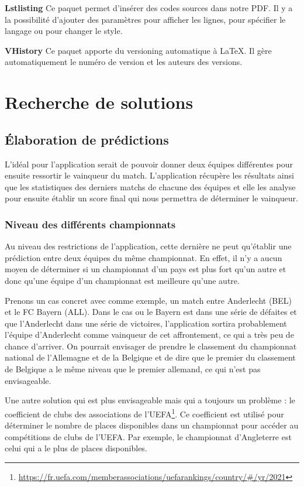\documentclass[a4paper,14pt]{extarticle}
\begin{document}
{\noindent\textbf{Lstlisting}
Ce paquet permet d'insérer des codes sources dans notre PDF. Il y a la possibilité d'ajouter des paramètres pour afficher les lignes, pour spécifier le langage ou pour changer le style.

\noindent\textbf{VHistory}
Ce paquet apporte du versioning automatique à \LaTeX. Il gère automatiquement le numéro de version et les auteurs des versions.

\section{Recherche de solutions}

\subsection{Élaboration de prédictions}

L'idéal pour l'application serait de pouvoir donner deux équipes différentes pour ensuite ressortir le vainqueur du match. L'application récupère les résultats ainsi que les statistiques des derniers matchs de chacune des équipes et elle les analyse pour ensuite établir un score final qui nous permettra de déterminer le vainqueur.


\subsubsection{Niveau des différents championnats}
\label{niveauDifferentChampionnats}
Au niveau des restrictions de l'application, cette dernière ne peut qu'établir une prédiction entre deux équipes du même championnat. En effet, il n'y a aucun moyen de déterminer si un championnat d'un pays est plus fort qu'un autre et donc qu'une équipe d'un championnat est meilleure qu'une autre. 

Prenons un cas concret avec comme exemple, un match entre Anderlecht (BEL) et le FC Bayern (ALL). Dans le cas ou le Bayern est dans une série de défaites et que l'Anderlecht dans une série de victoires, l'application sortira probablement l'équipe d'Anderlecht comme vainqueur de cet affrontement, ce qui a très peu de chance d'arriver. 
On pourrait envisager de prendre le classement du championnat national de l'Allemagne et de la Belgique et de dire que le premier du classement de Belgique a le même niveau que le premier allemand, ce qui n'est pas envisageable.  

Une autre solution qui est plus envisageable mais qui a toujours un problème : le coefficient de clubs des associations de l'UEFA\footnote{\url{https://fr.uefa.com/memberassociations/uefarankings/country/\#/yr/2021}}. Ce coefficient est utilisé pour déterminer le nombre de places disponibles dans un championnat pour accéder au compétitions de clubs de l'UEFA. Par exemple, le championnat d'Angleterre est celui qui a le plus de places disponibles.

}
\end{document}
